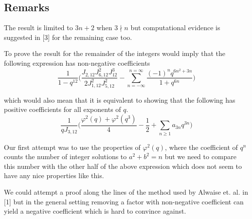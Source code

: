 \subsection{Remarks}

The result is limited to $3n+2$ when $3\nmid n$ but computational evidence is suggested in [3] for the remaining case too.

To prove the result for the remainder of the integers would imply that the following expression has non-negative coefficients
$$\frac{1}{1-q^{12}}\bigg(\frac{J_{2,12}J_{6,12}^2J_{12}^3}{2J_{1,12}^2J_{5,12}^2} - \sum_{n = -\infty}^{n = \infty}\frac{(-1)^nq^{6n^2+3n}}{1+q^{6n}}\bigg)$$

which would also mean that it is equivalent to showing that the following has positive coefficients for all exponents of $q$.
$$\frac{1}{qJ_{3,12}}\bigg(\frac{\varphi^2(q) + \varphi^2(q^3)}{4} - \frac{1}{2} + \sum_{n\geq 1}a_{3n}q^{3n}\bigg)$$

Our first attempt was to use the properties of $\varphi^2(q)$, where the coefficient of $q^n$ counts the number of integer solutions to $a^2 + b^2 = n$ but we need to compare this number with the other half of the above expression which does not seem to have any nice properties like this.

We could attempt a proof along the lines of the method used by Alwaise et. al. in [1] but in the general setting removing a factor with non-negative coefficient can yield a negative coefficient which is hard to convince against. 

